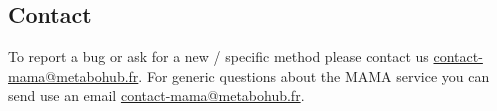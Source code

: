 
\subsection{Contact}
\hspace*{\parindent}
To report a bug or ask for a new / specific method please contact us \via \href{mailto:contact-mama@metabohub.fr?subject=\%5BWebservice-REST\%20Issue\%5D}{contact-mama@metabohub.fr}. 
For generic questions about the MAMA service you can send use an email \via \href{mailto:contact-mama@metabohub.fr?subject=\%5BWebservice-REST\%5D}{contact-mama@metabohub.fr}. 

\newpage


%
%


